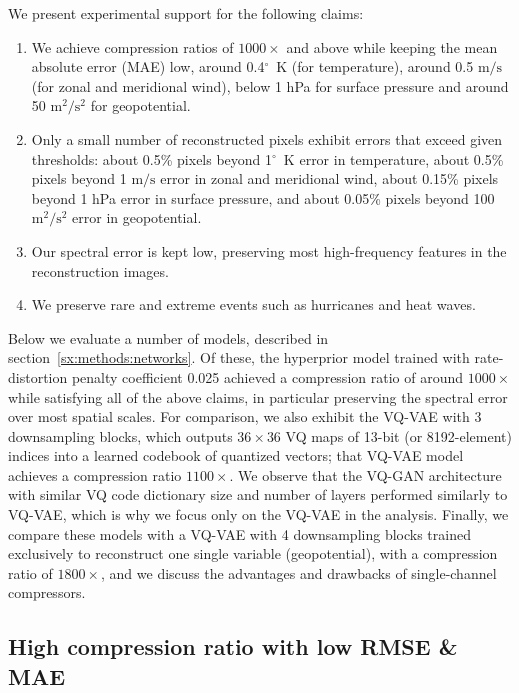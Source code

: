 \documentclass[11pt, a4paper, logo, copyright, numbering]{googledeepmind}
\begin{document}
We present experimental support for the following claims:
\begin{enumerate}
    \item We achieve compression ratios of $1000\times$ and above while keeping the mean absolute error (MAE) low, around 0.4$^\circ$~K (for temperature), around 0.5 $\text{m}/\text{s}$ (for zonal and meridional wind), below 1 hPa for surface pressure and around 50 $\text{m}^2/\text{s}^2$ for geopotential.
    \label{claim:cr_and_mae}
    \item Only a small number of reconstructed pixels exhibit errors that exceed given thresholds: about 0.5\% pixels beyond 1$^\circ$~K error in temperature, about 0.5\% pixels beyond 1 $\text{m}/\text{s}$ error in zonal and meridional wind, about 0.15\% pixels beyond 1 hPa error in surface pressure, and about 0.05\% pixels beyond 100 $\text{m}^2/\text{s}^2$ error in geopotential. \label{claim:few_bad_pixels}
    \item Our spectral error is kept low, preserving most high-frequency features in the reconstruction images.
    \item We preserve rare and extreme events such as hurricanes and heat waves.
\end{enumerate}
Below we evaluate a number of models, described in section~\ref{sx:methods:networks}. Of these, the hyperprior model trained with rate-distortion penalty coefficient 0.025 achieved a compression ratio of around $1000 \times$ while satisfying all of the above claims, in particular preserving the spectral error over most spatial scales. For comparison, we also exhibit the VQ-VAE with 3 downsampling blocks, which outputs $36 \times 36$ VQ maps of 13-bit (or 8192-element) indices into a learned codebook of quantized vectors; that VQ-VAE model achieves a compression ratio $1100 \times$. We observe that the VQ-GAN architecture with similar VQ code dictionary size and number of layers performed similarly to VQ-VAE, which is why we focus only on the VQ-VAE in the analysis.
Finally, we compare these models with a VQ-VAE with 4 downsampling blocks trained exclusively to reconstruct one single variable (geopotential), with a compression ratio of $1800 \times$, and we discuss the advantages and drawbacks of single-channel compressors.


\subsection{High compression ratio with low RMSE \& MAE}
\end{document}

